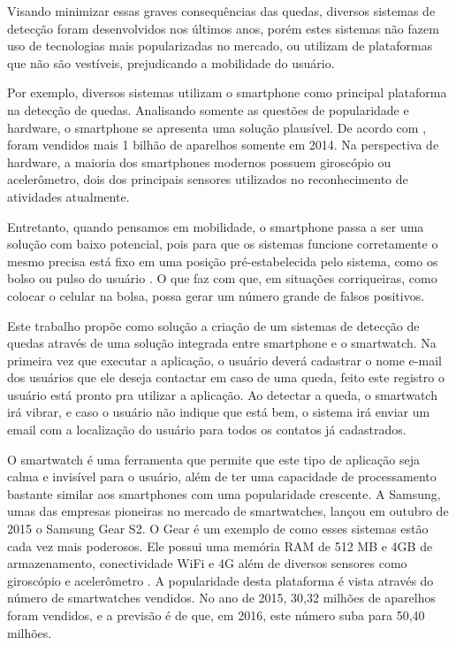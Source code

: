 Visando minimizar essas graves consequências das quedas, diversos sistemas de detecção foram desenvolvidos nos últimos anos, porém estes sistemas não fazem uso de tecnologias mais popularizadas no mercado, ou utilizam de plataformas que não são vestíveis, prejudicando a mobilidade do usuário. 

Por exemplo, diversos sistemas utilizam o smartphone como principal plataforma na detecção de quedas. Analisando somente as questões de popularidade e hardware, o smartphone se apresenta uma solução plausível. De acordo com \cite{smartphoneSales:15}, foram vendidos  mais 1 bilhão de aparelhos somente em 2014. Na perspectiva de hardware, a maioria dos smartphones modernos possuem giroscópio ou  acelerômetro, dois dos principais sensores utilizados no reconhecimento de atividades atualmente.
 
Entretanto, quando pensamos em mobilidade, o smartphone passa a ser uma solução com baixo potencial,  pois para que os sistemas funcione corretamente o mesmo precisa está fixo em uma posição pré-estabelecida pelo sistema, como os bolso ou pulso do usuário \cite{FallDectionSmartPhone:12}. O que faz com que, em situações corriqueiras, como colocar o celular na bolsa, possa gerar um número grande de falsos positivos.

Este trabalho propõe como solução a criação de um sistemas de detecção de quedas através de uma solução integrada entre smartphone e o smartwatch. Na primeira vez que executar a aplicação, o usuário deverá cadastrar o nome e-mail dos usuários que ele deseja contactar em caso de uma  queda, feito este registro o usuário está pronto pra utilizar a aplicação. Ao detectar a queda, o smartwatch irá vibrar, e caso o usuário não indique que está bem, o sistema irá enviar um email com a localização do usuário para todos os contatos já cadastrados.   

O smartwatch é uma ferramenta que permite que este tipo de aplicação seja calma e invisível para o usuário, além de ter uma capacidade de processamento bastante similar aos smartphones com uma popularidade crescente. A Samsung, umas das empresas pioneiras no mercado de smartwatches, lançou em outubro de 2015 o Samsung Gear S2. O Gear é um exemplo de como esses sistemas estão cada vez mais poderosos. Ele possui uma memória RAM de 512 MB e 4GB de armazenamento,  conectividade WiFi e 4G além de diversos sensores como giroscópio e acelerômetro \cite{samsungSpecification:16}. A popularidade desta plataforma é vista através do número de smartwatches vendidos. No ano de 2015, 30,32 milhões de aparelhos foram vendidos, e a previsão é de que, em 2016, este número suba para 50,40 milhões. 


